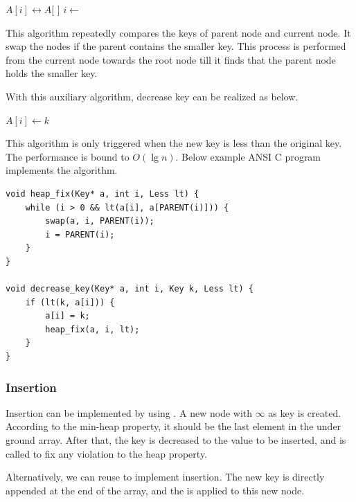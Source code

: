 \documentclass[b5paper]{article}
\begin{document}
\begin{algorithmic}[1]
    \State {} $A[i] \leftrightarrow A[$  $]$
    \State $i \gets$  
  \EndWhile
\EndFunction
\end{algorithmic}

This algorithm repeatedly compares the keys of parent node and
current node. It swap the nodes if
the parent contains the smaller key. This process is performed
from the current node towards the root node till it finds that
the parent node holds the smaller key.

With this auxiliary algorithm, decrease key can be realized
as below.

\begin{algorithmic}[1]
    \State $A[i] \gets k$
    \State {}
  \EndIf
\EndFunction
\end{algorithmic}

This algorithm is only triggered when the new key
is less than the original key. The performance is bound to $O(\lg n)$.
Below example ANSI C program implements the algorithm.

\lstset{language=C}
\begin{lstlisting}
void heap_fix(Key* a, int i, Less lt) {
    while (i > 0 && lt(a[i], a[PARENT(i)])) {
        swap(a, i, PARENT(i));
        i = PARENT(i);
    }
}

void decrease_key(Key* a, int i, Key k, Less lt) {
    if (lt(k, a[i])) {
        a[i] = k;
        heap_fix(a, i, lt);
    }
}
\end{lstlisting}

\subsubsection{Insertion}

Insertion can be implemented by using  \cite{CLRS}.
A new node with $\infty$ as key is created. According
to the min-heap property, it should be the last element
in the under ground array. After that, the key is decreased to
the value to be inserted, and  is called
to fix any violation to the heap property.

Alternatively, we can reuse  to implement
insertion. The new key is directly appended at the end of the array,
and the  is applied to this new node.
\end{document}
